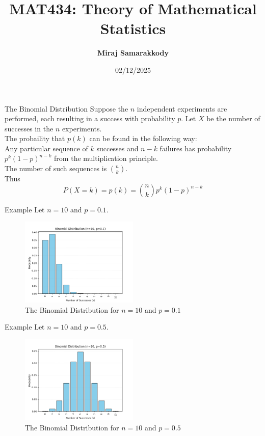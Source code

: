 \documentclass{beamer}
\title{MAT434: Theory of Mathematical Statistics}
\author{\textbf{Miraj Samarakkody}}
\institute{Tougaloo College}
\date{02/12/2025}
\begin{document}
\begin{frame}
    \titlepage
\end{frame}

\begin{frame}{The Binomial Distribution}
    Suppose the \(n\) independent experiments are performed, each resulting in a success with probability \(p\). Let \(X\) be the number of successes in the \(n\) experiments.\\
    \vspace{0.1in}
    \pause
    The probaility that \(p(k)\) can be found in the following way:\\
    \vspace{0.1in}\pause
    Any particular sequence of \(k\) successes and \(n-k\) failures has probability \(p^k(1-p)^{n-k}\) from the multiplication principle. \\
    \pause
    \vspace{0.1in}
    The number of such sequences is \(\binom{n}{k}\).\\\pause
    \vspace{0.1in}
    Thus \[
    P(X=k)=p(k)=\binom{n}{k}p^k(1-p)^{n-k}
    \]

\end{frame}

\begin{frame}{Example}
    Let \(n=10\) and \(p=0.1\). \pause
    \begin{figure}
        \centering
        \includegraphics[width=0.5\textwidth]{Figures/Figure_1.png}
        \caption{The Binomial Distribution for \(n=10\) and \(p=0.1\)}
        \label{fig:binomial1}
    \end{figure}
\end{frame}

\begin{frame}{Example}
    Let \(n=10\) and \(p=0.5\). \pause
    \begin{figure}
        \centering
        \includegraphics[width=0.5\textwidth]{Figures/Figure_2.png}
        \caption{The Binomial Distribution for \(n=10\) and \(p=0.5\)}
        \label{fig:binomial2}
    \end{figure}
\end{frame}
\end{document}
